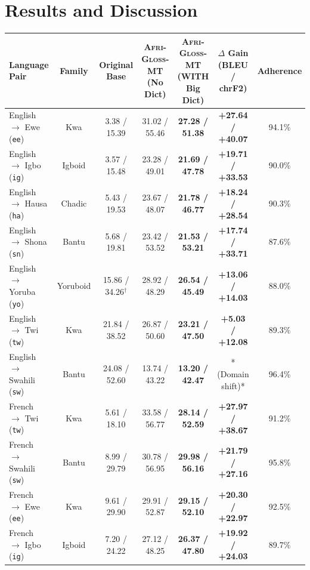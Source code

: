 \documentclass[10pt,twocolumn]{article}
\newcommand{\agm}{\textsc{Afri-Gloss-MT}}
\begin{document}
\section{Results and Discussion}

\begin{table}[t]
\centering
\small
\setlength{\tabcolsep}{5pt}
\begin{tabular}{lcccccc}
\toprule
\textbf{Language Pair} & \textbf{Family} & \textbf{Original Base} & \textbf{\agm{} (No Dict)} & \textbf{\agm{} (WITH Big Dict)} & \textbf{$\Delta$ Gain (BLEU / chrF2)} & \textbf{Adherence} \\
\midrule
English $\rightarrow$ Ewe (\texttt{ee}) & Kwa & 3.38 / 15.39 & 31.02 / 55.46 & \textbf{27.28 / 51.38} & \textbf{+27.64 / +40.07} & 94.1\% \\
English $\rightarrow$ Igbo (\texttt{ig}) & Igboid & 3.57 / 15.48 & 23.28 / 49.01 & \textbf{21.69 / 47.78} & \textbf{+19.71 / +33.53} & 90.0\% \\
English $\rightarrow$ Hausa (\texttt{ha}) & Chadic & 5.43 / 19.53 & 23.67 / 48.07 & \textbf{21.78 / 46.77} & \textbf{+18.24 / +28.54} & 90.3\% \\
English $\rightarrow$ Shona (\texttt{sn}) & Bantu & 5.68 / 19.81 & 23.42 / 53.52 & \textbf{21.53 / 53.21} & \textbf{+17.74 / +33.71} & 87.6\% \\
English $\rightarrow$ Yoruba (\texttt{yo}) & Yoruboid & 15.86 / 34.26$^\dagger$ & 28.92 / 48.29 & \textbf{26.54 / 45.49} & \textbf{+13.06 / +14.03} & 88.0\% \\
English $\rightarrow$ Twi (\texttt{tw}) & Kwa & 21.84 / 38.52 & 26.87 / 50.60 & \textbf{23.21 / 47.50} & \textbf{+5.03 / +12.08} & 89.3\% \\
English $\rightarrow$ Swahili (\texttt{sw}) & Bantu & 24.08 / 52.60 & 13.74 / 43.22 & \textbf{13.20 / 42.47} & *(Domain shift)* & 96.4\% \\
\midrule
French $\rightarrow$ Twi (\texttt{tw}) & Kwa & 5.61 / 18.10 & 33.58 / 56.77 & \textbf{28.14 / 52.59} & \textbf{+27.97 / +38.67} & 91.2\% \\
French $\rightarrow$ Swahili (\texttt{sw}) & Bantu & 8.99 / 29.79 & 30.78 / 56.95 & \textbf{29.98 / 56.16} & \textbf{+21.79 / +27.16} & 95.8\% \\
French $\rightarrow$ Ewe (\texttt{ee}) & Kwa & 9.61 / 29.90 & 29.91 / 52.87 & \textbf{29.15 / 52.10} & \textbf{+20.30 / +22.97} & 92.5\% \\
French $\rightarrow$ Igbo (\texttt{ig}) & Igboid & 7.20 / 24.22 & 27.12 / 48.25 & \textbf{26.37 / 47.80} & \textbf{+19.92 / +24.03} & 89.7\% \\

\end{tabular}
\end{table}
\end{document}
